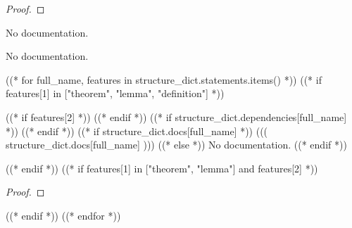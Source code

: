 \begin{proof}
    \leanok
\end{proof}

\begin{theorem}\label{IsValExtension.coe_algebraMap_valuationSubring}
                No documentation.
    \end{theorem}

\begin{theorem}\label{IsValExtension.integerAlgebra_injective}
                No documentation.
    \end{theorem}




((* for full_name, features in structure_dict.statements.items() *))
((* if features[1] in ["theorem", "lemma", "definition"] *))
\begin{((( features[1] )))}\label{((( full_name )))}
    ((* if features[2] *))
    \leanok
    ((* endif *))
    ((* if structure_dict.dependencies[full_name] *))
    ((* endif *))
    ((* if structure_dict.docs[full_name] *))
        ((( structure_dict.docs[full_name] )))
    ((* else *))
        No documentation.
    ((* endif *))
\end{((( features[1] )))}

((* endif *))
((* if features[1] in ["theorem", "lemma"] and features[2] *))
\begin{proof}
    \leanok
\end{proof}

((* endif *))
((* endfor *))
